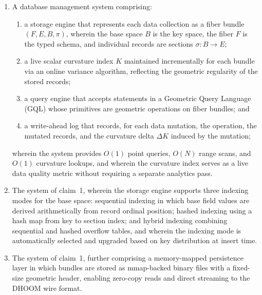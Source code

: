 \documentclass[11pt,letterpaper]{article}
\begin{document}
\begin{enumerate}

\item A database management system comprising:
\begin{enumerate}[label=(\alph*)]
  \item a storage engine that represents each data collection as a fiber bundle $(F, E, B, \pi)$, wherein the base space $B$ is the key space, the fiber $F$ is the typed schema, and individual records are sections $\sigma: B \to E$;
  \item a live scalar curvature index $K$ maintained incrementally for each bundle via an online variance algorithm, reflecting the geometric regularity of the stored records;
  \item a query engine that accepts statements in a Geometric Query Language (GQL) whose primitives are geometric operations on fiber bundles; and
  \item a write-ahead log that records, for each data mutation, the operation, the mutated records, and the curvature delta $\Delta K$ induced by the mutation;
\end{enumerate}
wherein the system provides $O(1)$ point queries, $O(N)$ range scans, and $O(1)$ curvature lookups, and wherein the curvature index serves as a live data quality metric without requiring a separate analytics pass.

\item The system of claim~1, wherein the storage engine supports three indexing modes for the base space: sequential indexing in which base field values are derived arithmetically from record ordinal position; hashed indexing using a hash map from key to section index; and hybrid indexing combining sequential and hashed overflow tables, and wherein the indexing mode is automatically selected and upgraded based on key distribution at insert time.

\item The system of claim~1, further comprising a memory-mapped persistence layer in which bundles are stored as mmap-backed binary files with a fixed-size geometric header, enabling zero-copy reads and direct streaming to the DHOOM wire format.


\end{enumerate}
\end{document}
